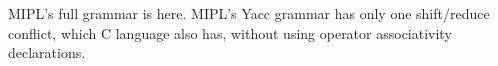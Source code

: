 \documentclass[prodmode,acmtecs]{acmsmall}
\begin{document}
MIPL's full grammar is here. MIPL's Yacc grammar has only one shift/reduce conflict, which C language also has, without using operator associativity declarations.


%
%




%
%



\medskip

\end{document}
